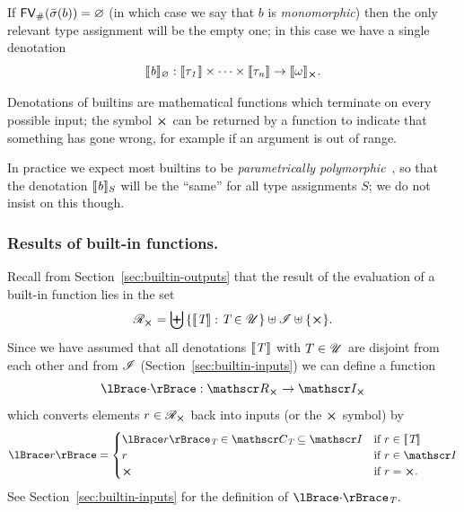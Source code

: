 \medskip
\noindent If $\mathsf{FV}_{\#}(\bar{\sigma}(b)) = \varnothing$ (in which case we say that $b$ is
\textit{monomorphic}) then the only relevant type assignment will be the empty
one; in this case we have a single denotation
$$
\denote{b}_\varnothing: \denote{\tau_1} \times \cdots \times \denote{\tau_n} \rightarrow \withError{\denote{\omega}}.
$$

\smallskip
\noindent Denotations of builtins are mathematical functions which terminate on
every possible input; the symbol $\errorX$ can be returned by a function to
indicate that something has gone wrong, for example if an argument is out of
range.

\smallskip
\noindent In practice we expect most builtins to be \textit{parametrically
  polymorphic}~\cite{Wadler-theorems-for-free, Reynolds-parametric}, so that the
denotation $\llbracket\mathit{b}\rrbracket_S$ will be the ``same'' for all type assignments $S$; we do
not insist on this though.

\subsubsection{Results of built-in functions.}
\label{sec:builtin-results}
Recall from Section~\ref{sec:builtin-outputs} that the result of the
evaluation of a built-in function lies in the set
$$
\R_{\errorX} = \bigdisj\left\{\denote{\tn}: \tn \in \Uni \right\} \disj \Inputs \disj \{\errorX\}.
$$
\noindent Since we have assumed that all denotations $\llbracket\mathit{T}\rrbracket$ with $T \in
\mathscr{U}$ are disjoint from each other and from $\mathscr{I}$
(Section~\ref{sec:builtin-inputs}) we can define a function
$$
\reify{\cdot}: \R_{\errorX} \rightarrow \withError{\Inputs}
$$
which converts elements $r \in \R_{\errorX}$ back into inputs (or the $\errorX$ symbol) by
$$
\reify{r} =
\begin{cases}
  \reify{r}_{\tn} \in \Con{\tn} \subseteq \Inputs & \text{if $r \in \denote{\tn}$}\\
  r & \text{if $r \in \Inputs$}\\
  \errorX & \text{if $r = \errorX$}.
\end{cases}
$$
\noindent See Section~\ref{sec:builtin-inputs} for the definition of
$\reify{\cdot}_{\tn}$.%


